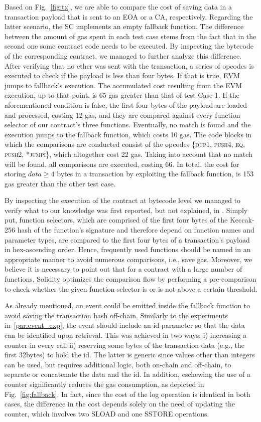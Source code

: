 Based on Fig.~\ref{fig:tx}, we are able to compare the cost of saving data in a transaction payload that is sent to an EOA or a CA, respectively. Regarding the latter scenario, the SC implements an empty fallback function. The difference between the amount of gas spent in each test case stems from the fact that in the second one some contract code needs to be executed. By inspecting the bytecode of the corresponding contract, we managed to further analyze this difference. After verifying that no ether was sent with the transaction, a series of opcodes is executed to check if the payload is less than four bytes. If that is true, EVM jumps to fallback’s execution. The accumulated cost resulting from the EVM execution, up to that point, is 65 gas greater than that of test Case 1. If the aforementioned condition is false, the first four bytes of the payload are loaded and processed, costing 12 gas, and they are compared against every function selector of our contract’s three functions. Eventually, no match is found and the execution jumps to the fallback function, which costs 10 gas. The code blocks in which the comparisons are conducted consist of the opcodes \textsc{\{dup1, push4, eq, push2, *jumpi\}}, which altogether cost 22 gas. Taking into account that no match will be found, all comparisons are executed, costing 66. In total, the cost for storing \(data\geqslant 4\) bytes in a transaction by exploiting the fallback function, is 153 gas greater than the other test case.


By inspecting the execution of the contract at bytecode level we managed to verify what to our knowledge was first reported, but not explained, in \citep{chen_2018}. Simply put, function selectors, which are comprised of the first four bytes of the Keccak-256 hash of the function's signature and therefore depend on function names and parameter types, are compared to the first four bytes of a transaction’s payload in hex-ascending order. Hence, frequently used functions should be named in an appropriate manner to avoid numerous comparisons, i.e., save gas. Moreover, we believe it is necessary to point out that for a contract with a large number of functions, Solidity optimizes the comparison flow by performing a pre-comparison to check whether the given function selector is or is not above a certain threshold.

As already mentioned, an event could be emitted inside the fallback function to avoid saving the transaction hash off-chain. Similarly to the experiments in~\ref{par:event_exp}, the event should include an id parameter so that the data can be identified upon retrieval. This was achieved in two ways: i) increasing a counter in every call ii) reserving some bytes of the transaction data (e.g., the first 32bytes) to hold the id. The latter is generic since values other than integers can be used, but requires additional logic, both on-chain and off-chain, to separate or concatenate the data and the id. In addition, eschewing the use of a counter significantly reduces the gas consumption, as depicted in Fig.~\ref{fig:fallback}. In fact, since the cost of the log operation is identical in both cases, the difference in the cost depends solely on the need of updating the counter, which involves two SLOAD and one SSTORE operations.


